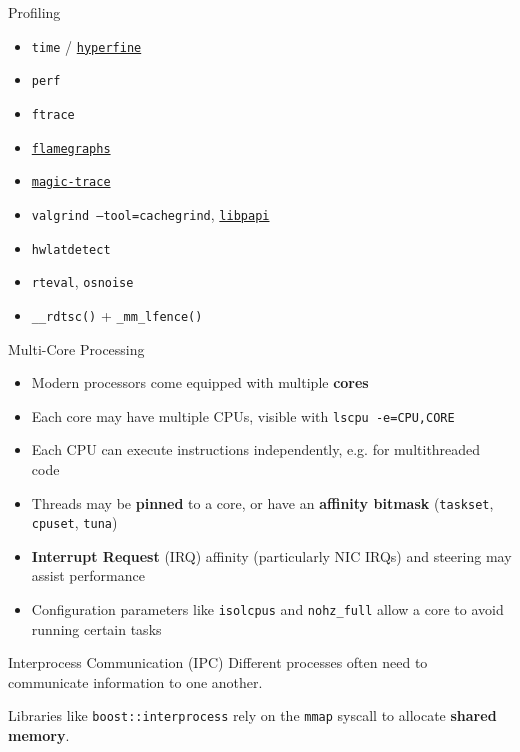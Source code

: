 \documentclass{beamer}
\begin{document}
\begin{frame}{Profiling}
	\begin{itemize}
		\item \texttt{time} / \href{https://github.com/sharkdp/hyperfine}{\texttt{hyperfine}}
		\item \texttt{perf}
		\item \texttt{ftrace}
		\item \href{https://www.brendangregg.com/FlameGraphs/cpu-bash-flamegraph.svg}{\texttt{flamegraphs}}
		\item \href{https://github.com/janestreet/magic-trace}{\texttt{magic-trace}}
		\item \texttt{valgrind --tool=cachegrind}, \href{https://github.com/david-grs/papipp}{\texttt{libpapi}}
		\item \texttt{hwlatdetect}
		\item \texttt{rteval}, \texttt{osnoise}
		\item \texttt{\_\_rdtsc()} + \texttt{\_mm\_lfence()}
	\end{itemize}
\end{frame}

\begin{frame}{Multi-Core Processing}
	\begin{itemize}
		\item Modern processors come equipped with multiple \textbf{cores}
		\item Each core may have multiple CPUs, visible with \texttt{lscpu -e=CPU,CORE}
		\item Each CPU can execute instructions independently, e.g. for multithreaded code
		\pause
		\item Threads may be \textbf{pinned} to a core, or have an \textbf{affinity bitmask} (\texttt{taskset}, \texttt{cpuset}, \texttt{tuna})
		\item \textbf{Interrupt Request} (IRQ) affinity (particularly NIC IRQs) and steering may assist performance
		\item Configuration parameters like \texttt{isolcpus} and \texttt{nohz\_full} allow a core to avoid running certain tasks
	\end{itemize}

	\pause
	\begin{block}{Interprocess Communication (IPC)}
		Different processes often need to communicate information to one another.

		Libraries like \texttt{boost::interprocess} rely on the \texttt{mmap} syscall to allocate \textbf{shared memory}.
	\end{block}
\end{frame}
\end{document}
